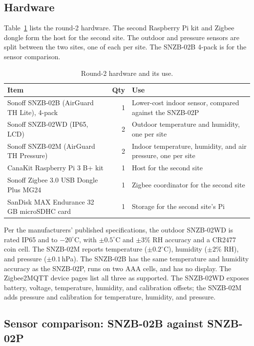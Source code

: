 \documentclass[11pt,letterpaper]{article}
\begin{document}
\subsection{Hardware}

Table~\ref{tab:round2-hw} lists the round-2 hardware. The second Raspberry Pi
kit and Zigbee dongle form the host for the second site. The outdoor and
pressure sensors are split between the two sites, one of each per site. The
SNZB-02B 4-pack is for the sensor comparison.

\begin{table}[ht]
\centering
\caption{Round-2 hardware and its use.}
\label{tab:round2-hw}
\begin{tabular}{@{}p{2.6in}rp{2.4in}@{}}
\toprule
Item & Qty & Use \\
\midrule
Sonoff SNZB-02B (AirGuard TH Lite), 4-pack & 1 & Lower-cost indoor sensor, compared against the SNZB-02P \\
Sonoff SNZB-02WD (IP65, LCD) & 2 & Outdoor temperature and humidity, one per site \\
Sonoff SNZB-02M (AirGuard TH Pressure) & 2 & Indoor temperature, humidity, and air pressure, one per site \\
CanaKit Raspberry Pi 3 B+ kit & 1 & Host for the second site \\
Sonoff Zigbee 3.0 USB Dongle Plus MG24 & 1 & Zigbee coordinator for the second site \\
SanDisk MAX Endurance 32\,GB microSDHC card & 1 & Storage for the second site's Pi \\
\bottomrule
\end{tabular}
\end{table}

Per the manufacturers' published specifications, the outdoor SNZB-02WD is rated
IP65 and to $-20^\circ$C, with $\pm0.5^\circ$C and $\pm3\%$ RH accuracy and a
CR2477 coin cell. The SNZB-02M reports temperature ($\pm0.2^\circ$C), humidity
($\pm2\%$ RH), and pressure ($\pm0.1$\,hPa). The SNZB-02B has the same
temperature and humidity accuracy as the SNZB-02P, runs on two AAA cells, and
has no display. The Zigbee2MQTT device pages list all three as supported. The
SNZB-02WD exposes battery, voltage, temperature, humidity, and calibration
offsets; the SNZB-02M adds pressure and calibration for temperature, humidity,
and pressure.

\subsection{Sensor comparison: SNZB-02B against SNZB-02P}
\label{sec:sensor-comparison}
\end{document}
